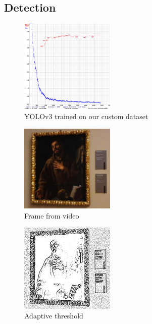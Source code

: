 \subsection{Detection}

\begin{figure}[h!]
    \centering
        \includegraphics[width=0.4\textwidth]{pictures/painting_detection/training-v3.png}
    \caption{YOLOv3 trained on our custom dataset}
    \label{fig:training-v3}
\end{figure}

\begin{figure}[]
    \centering
        \includegraphics[width=0.4\textwidth]{pictures/painting_detection/Frame2.jpg}
    \caption{Frame from video}
    \label{fig:a}
\end{figure}

\begin{figure}[]
    \centering
        \includegraphics[width=0.4\textwidth]{pictures/painting_detection/Adaptive_threshold.jpg}
    \caption{Adaptive threshold}
    \label{fig:b}
\end{figure}


